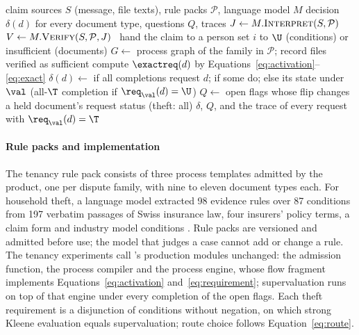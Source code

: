 \begin{algorithm}[t]
\caption{\casepath decides the evidence plan of one claim.}
\label{alg:agent}
\small
\begin{algorithmic}[1]
\Require claim sources $S$ (message, file texts), rule packs $\mathcal{P}$, language model $M$
\Ensure decision $\delta(d)$ for every document type, questions $Q$, traces
\State $J \gets M.\textsc{Interpret}(S,\mathcal{P})$ 
\State $V \gets M.\textsc{Verify}(S,\mathcal{P},J)$ 
\ \Return hand the claim to a person \EndIf
{} 
     \State set $i$ to $\U$ (conditions) or insufficient (documents)
  \EndIf
\EndFor
\State $G \gets$ process graph of the family in $\mathcal{P}$; record files verified as sufficient
  \State compute $\exactreq(d)$ by Equations~\eqref{eq:activation}--\eqref{eq:exact}
  \State $\delta(d)\gets$ \request if all completions request $d$; \hold if some do; else its state under $\val$ (all-$\T$ completion if $\req_\val(d)=\U$)
\EndFor
\State $Q\gets$ open flags whose flip changes a held document's request status (theft: all)
\State \Return $\delta$, $Q$, and the trace of every request with $\req_\val(d)=\T$
\end{algorithmic}
\end{algorithm}

\paragraph{Rule packs and implementation}
The tenancy rule pack consists of three process templates admitted by the product, one per dispute family, with nine to eleven document types each. For household theft, a language model extracted 98 evidence rules over 87 conditions from 197 verbatim passages of Swiss insurance law, four insurers' policy terms, a claim form and industry model conditions \cite{casepath2026repo}. Rule packs are versioned and admitted before use; the model that judges a case cannot add or change a rule. The tenancy experiments call \casepath's production modules unchanged: the admission function, the process compiler and the process engine, whose flow fragment implements Equations~\eqref{eq:activation} and~\eqref{eq:requirement}; supervaluation runs on top of that engine under every completion of the open flags. Each theft requirement is a disjunction of conditions without negation, on which strong Kleene evaluation equals supervaluation; route choice follows Equation~\eqref{eq:route}.
